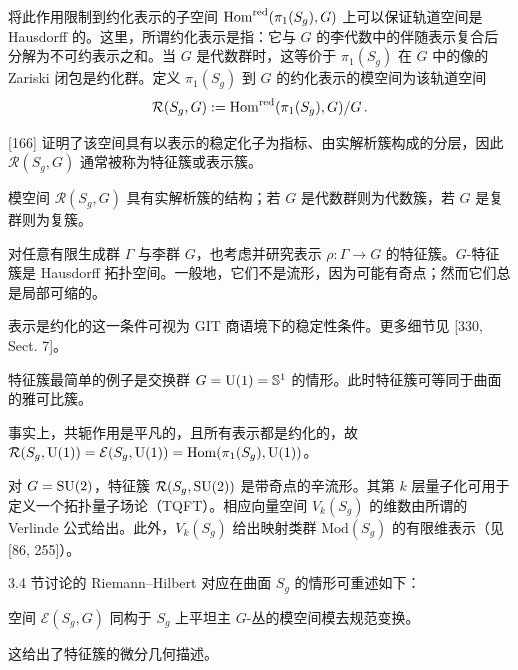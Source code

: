 将此作用限制到约化表示的子空间 $\operatorname{Hom}^{\mathrm{red}}(\pi_1(S_g),G)$ 上可以保证轨道空间是 Hausdorff 的。这里，所谓约化表示是指：它与 $G$ 的李代数中的伴随表示复合后分解为不可约表示之和。当 $G$ 是代数群时，这等价于 $\pi_1(S_g)$ 在 $G$ 中的像的 Zariski 闭包是约化群。定义 $\pi_1(S_g)$ 到 $G$ 的约化表示的模空间为该轨道空间
\[
\mathcal{R}(S_g,G):=\operatorname{Hom}^{\mathrm{red}}(\pi_1(S_g),G)/G\,.
\]

[166] 证明了该空间具有以表示的稳定化子为指标、由实解析簇构成的分层，因此 $\mathcal{R}(S_g,G)$ 通常被称为特征簇或表示簇。

\begin{theorem}[9.1] 模空间 $\mathcal{R}(S_g,G)$ 具有实解析簇的结构；若 $G$ 是代数群则为代数簇，若 $G$ 是复群则为复簇。\end{theorem}

\begin{remark}[9.2] 对任意有限生成群 $\Gamma$ 与李群 $G$，也考虑并研究表示 $\rho:\Gamma\to G$ 的特征簇。$G$-特征簇是 Hausdorff 拓扑空间。一般地，它们不是流形，因为可能有奇点；然而它们总是局部可缩的。\end{remark}

\begin{remark}[9.3] 表示是约化的这一条件可视为 GIT 商语境下的稳定性条件。更多细节见 [330, Sect. 7]。\end{remark}

\begin{example}[9.4] 特征簇最简单的例子是交换群 $G=\operatorname{U}(1)=\mathbb{S}^1$ 的情形。此时特征簇可等同于曲面的雅可比簇。

事实上，共轭作用是平凡的，且所有表示都是约化的，故 $\mathcal{R}(S_g,\operatorname{U}(1))=\mathcal{E}(S_g,\operatorname{U}(1))=\operatorname{Hom}(\pi_1(S_g),\operatorname{U}(1))$。\end{example}

\begin{example}[9.5] 对 $G=\operatorname{SU}(2)$，特征簇 $\mathcal{R}(S_g,\operatorname{SU}(2))$ 是带奇点的辛流形。其第 $k$ 层量子化可用于定义一个拓扑量子场论（TQFT）。相应向量空间 $V_k(S_g)$ 的维数由所谓的 Verlinde 公式给出。此外，$V_k(S_g)$ 给出映射类群 $\mathrm{Mod}(S_g)$ 的有限维表示（见 [86, 255]）。\end{example}

3.4 节讨论的 Riemann–Hilbert 对应在曲面 $S_g$ 的情形可重述如下：

\begin{theorem}[9.6] 空间 $\mathcal{E}(S_g,G)$ 同构于 $S_g$ 上平坦主 $G$-丛的模空间模去规范变换。\end{theorem}

这给出了特征簇的微分几何描述。

